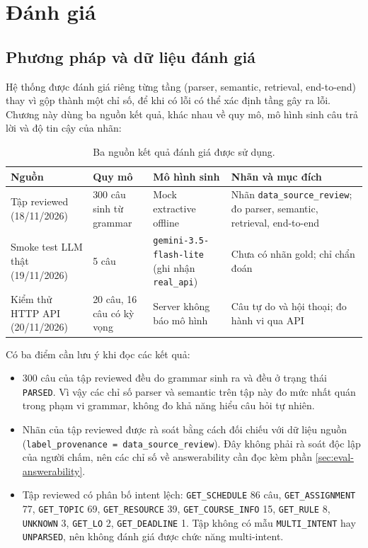 \chapter{Đánh giá}

\section{Phương pháp và dữ liệu đánh giá}

Hệ thống được đánh giá riêng từng tầng (parser, semantic, retrieval, end-to-end) thay vì gộp thành một chỉ số, để khi có lỗi có thể xác định tầng gây ra lỗi. Chương này dùng ba nguồn kết quả, khác nhau về quy mô, mô hình sinh câu trả lời và độ tin cậy của nhãn:

\begin{table}[H]
\centering
\small
\begin{tabular}{@{}p{}p{}p{}p{}@{}}
\toprule
Nguồn & Quy mô & Mô hình sinh & Nhãn và mục đích \\
\midrule
Tập reviewed (18/11/2026) & 300 câu sinh từ grammar & Mock extractive offline & Nhãn \texttt{data\_source\_review}; đo parser, semantic, retrieval, end-to-end \\
Smoke test LLM thật (19/11/2026) & 5 câu & \texttt{gemini-3.5-flash-lite} (ghi nhận \texttt{real\_api}) & Chưa có nhãn gold; chỉ chẩn đoán \\
Kiểm thử HTTP API (20/11/2026) & 20 câu, 16 câu có kỳ vọng & Server không báo mô hình & Câu tự do và hội thoại; đo hành vi qua API \\
\bottomrule
\end{tabular}
\caption{Ba nguồn kết quả đánh giá được sử dụng.}
\end{table}

Có ba điểm cần lưu ý khi đọc các kết quả:

\begin{itemize}
  \item 300 câu của tập reviewed đều do grammar sinh ra và đều ở trạng thái \texttt{PARSED}. Vì vậy các chỉ số parser và semantic trên tập này đo mức nhất quán trong phạm vi grammar, không đo khả năng hiểu câu hỏi tự nhiên.
  \item Nhãn của tập reviewed được rà soát bằng cách đối chiếu với dữ liệu nguồn (\texttt{label\_provenance = data\_source\_review}). Đây không phải rà soát độc lập của người chấm, nên các chỉ số về answerability cần đọc kèm phần \ref{sec:eval-answerability}.
  \item Tập reviewed có phân bố intent lệch: \texttt{GET\_SCHEDULE} 86 câu, \texttt{GET\_ASSIGNMENT} 77, \texttt{GET\_TOPIC} 69, \texttt{GET\_RESOURCE} 39, \texttt{GET\_COURSE\_INFO} 15, \texttt{GET\_RULE} 8, \texttt{UNKNOWN} 3, \texttt{GET\_LO} 2, \texttt{GET\_DEADLINE} 1. Tập không có mẫu \texttt{MULTI\_INTENT} hay \texttt{UNPARSED}, nên không đánh giá được chức năng multi-intent.
\end{itemize}

